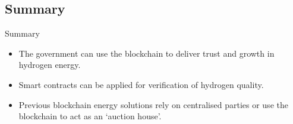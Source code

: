 \subsection{Summary}
\begin{frame}{Summary}
    \begin{itemize}
        \item The government can use the blockchain to deliver trust and growth
              in hydrogen energy.
        \item Smart contracts can be applied for verification of hydrogen
              quality.
        \item Previous blockchain energy
              solutions rely on centralised parties
              or use the blockchain to act as an `auction house'.
    \end{itemize}
\end{frame}